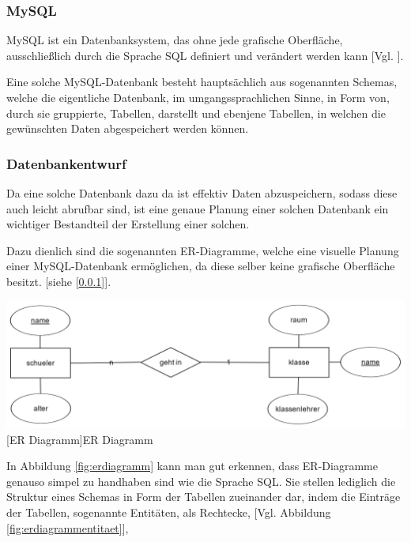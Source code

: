 \documentclass[12pt,a4paper,bibliography=totocnumbered,listof=totocnumbered]{scrartcl}
\begin{document}
\subsubsection{MySQL}
\label{sec:SQLMySQL}
MySQL ist ein Datenbanksystem, das ohne jede grafische Oberfläche, ausschließlich durch die Sprache SQL definiert und verändert werden kann [Vgl. \cite{omkt}].

Eine solche MySQL-Datenbank besteht hauptsächlich aus sogenannten \glqq Schemas\grqq{}, welche die eigentliche Datenbank, im umgangssprachlichen Sinne, in Form von, durch sie gruppierte, \glqq Tabellen\grqq{}, darstellt und ebenjene \glqq Tabellen\grqq{}, in welchen die gewünschten Daten abgespeichert werden können.

\subsubsection{Datenbankentwurf}
Da eine solche Datenbank\footnotemark{} dazu da ist effektiv Daten abzuspeichern, sodass diese auch leicht abrufbar sind, ist eine genaue Planung einer solchen Datenbank ein wichtiger Bestandteil der Erstellung einer solchen.


Dazu dienlich sind die sogenannten \glqq ER-Diagramme\grqq{}, welche eine visuelle Planung einer MySQL-Datenbank ermöglichen, da diese selber keine grafische Oberfläche besitzt. [siehe [\ref{sec:SQLMySQL}]].

\vspace{1em}
\begin{minipage}{\linewidth}
	\centering
	\includegraphics[width=1.0\linewidth]{Bilder/erdplus-diagram.png}
	[ER Diagramm]{ER Diagramm}
	\label{fig:erdiagramm}
\end{minipage}

In Abbildung \ref{fig:erdiagramm} 
kann man gut erkennen, dass ER-Diagramme genauso simpel zu handhaben sind wie die Sprache SQL.
Sie stellen lediglich die Struktur eines Schemas in Form der Tabellen zueinander dar, indem die Einträge der Tabellen, sogenannte Entitäten, als Rechtecke,  [Vgl. Abbildung \ref{fig:erdiagrammentitaet}], 
\end{document}
